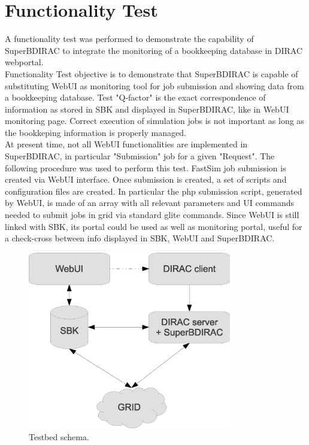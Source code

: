 \documentclass[journal]{IEEEtran}
\begin{document}
\section{Functionality Test}
\label{sec:test}

A functionality test was performed to demonstrate the capability of SuperBDIRAC to integrate the monitoring of a bookkeeping database in DIRAC webportal.\\
Functionality Test objective is to demonstrate that SuperBDIRAC is capable of substituting WebUI as monitoring tool for job submission and showing data from a bookkeeping database. Test "Q-factor" is the exact correspondence of information as stored in SBK and displayed in SuperBDIRAC, like in WebUI monitoring page. Correct execution of simulation jobs is not important as long as the bookkeping information is properly managed.\\
At present time, not all WebUI functionalities are implemented in SuperBDIRAC, in particular "Submission" job for a given "Request".
The following procedure was used to perform this test. FastSim job submission is created via WebUI interface. Once submission is created, a set of scripts and configuration files are created. In particular the php submission script, generated by WebUI, is made of an array with all relevant parameters and UI commands needed to submit jobs in grid via standard glite commands.
Since WebUI is still linked with SBK, its portal could be used as well as monitoring portal, useful for a check-cross between info displayed in SBK, WebUI and SuperBDIRAC.\\

\begin{figure}[!h]
\centering
\includegraphics[width=3.5in]{testbed.eps}
\caption{Testbed schema.}
\label{fig:BK_entities}
\end{figure}
\end{document}
